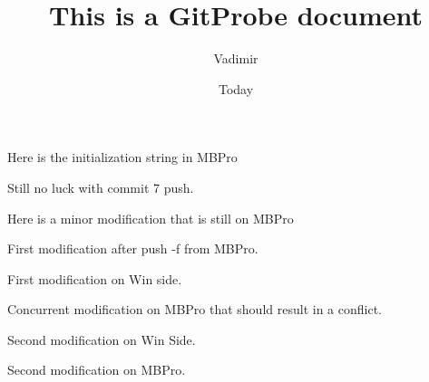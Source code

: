 \documentclass[]{article}
\begin{document}
\title{This is a GitProbe document}
\author{Vadimir}
\date{Today}
\maketitle

Here is the initialization string in MBPro

Still no luck with commit 7 push.

Here is a minor modification that is still on MBPro

First modification after push -f  from MBPro.

First modification on Win side.

Concurrent modification on MBPro that should result in a conflict.

Second modification on Win Side.

Second modification on MBPro.
\end{document}
